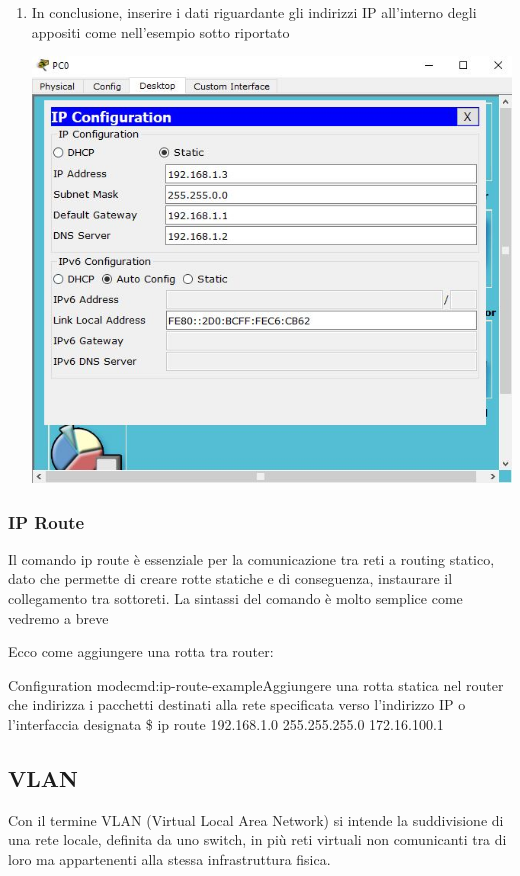 \begin{enumerate}
\begin{sfigure}
    \end{sfigure}
    \item In conclusione, inserire i dati riguardante gli indirizzi IP all’interno degli appositi come nell’esempio sotto riportato\par
    \begin{sfigure}
        \includegraphics[width=0.6\linewidth]{images/07.routing-sicurezza/04.ip-config-complete.jpg}
    \end{sfigure}
\end{enumerate}

\subsubsection*{IP Route}
Il comando ip route è essenziale per la comunicazione tra reti a routing statico, dato che permette di creare rotte statiche e di conseguenza, instaurare il collegamento tra sottoreti. La sintassi del comando è molto semplice come vedremo a breve

Ecco come aggiungere una rotta tra router:

\begin{cmds}[Router]{Configuration mode}{cmd:ip-route-example}{Aggiungere una rotta statica nel router che indirizza i pacchetti destinati alla \textcolor{Highlight1}{rete specificata} verso l'\textcolor{Highlight2}{indirizzo IP o l'interfaccia} designata }
    \$ ip route \textcolor{Highlight1}{192.168.1.0 255.255.255.0} \textcolor{Highlight2}{172.16.100.1}
\end{cmds}

\subsection{VLAN}
Con il termine VLAN (Virtual Local Area Network) si intende la suddivisione di una rete locale, definita da uno switch, in più reti virtuali non comunicanti tra di loro ma appartenenti alla stessa infrastruttura fisica.

